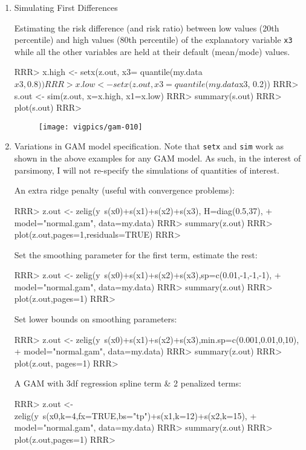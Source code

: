 \begin{enumerate}
\item Simulating First Differences

Estimating the risk difference (and risk ratio) between low values (20th percentile) and high values (80th percentile) of the explanatory variable {\tt x3} while all the other variables are held at their default (mean/mode) values. 

\begin{Schunk}
\begin{Sinput}
RRR> x.high <- setx(z.out,  x3= quantile(my.data$x3, 0.8))
RRR> x.low <- setx(z.out, x3 = quantile(my.data$x3, 0.2))
RRR> s.out <- sim(z.out, x=x.high, x1=x.low)
RRR> summary(s.out)
RRR> plot(s.out)
RRR> 
\end{Sinput}
\end{Schunk}
\begin{figure}[here]
\centering
\texttt{[image: vigpics/gam-010]}
\label{fig:plotgam}
\end{figure}

\item Variations in GAM model specification. Note that {\tt setx} and {\tt sim} work as shown in the above examples for any GAM model. As such, in the interest of parsimony, I will not re-specify the simulations of quantities of interest. 

An extra ridge penalty (useful with convergence problems):
\begin{Schunk}
\begin{Sinput}
RRR> z.out <- zelig(y~s(x0)+s(x1)+s(x2)+s(x3), H=diag(0.5,37), 
+    model="normal.gam", data=my.data) 
RRR> summary(z.out)
RRR> plot(z.out,pages=1,residuals=TRUE)
RRR> 
\end{Sinput}
\end{Schunk}
Set the smoothing parameter for the first term, estimate the rest:
\begin{Schunk}
\begin{Sinput}
RRR> z.out <- zelig(y~s(x0)+s(x1)+s(x2)+s(x3),sp=c(0.01,-1,-1,-1), 
+    model="normal.gam", data=my.data)
RRR> summary(z.out)
RRR> plot(z.out,pages=1)
RRR> 
\end{Sinput}
\end{Schunk}
Set lower bounds on smoothing parameters:
\begin{Schunk}
\begin{Sinput}
RRR> z.out <- zelig(y~s(x0)+s(x1)+s(x2)+s(x3),min.sp=c(0.001,0.01,0,10),  
+     model="normal.gam", data=my.data) 
RRR> summary(z.out)
RRR> plot(z.out, pages=1)
RRR> 
\end{Sinput}
\end{Schunk}
A GAM with 3df regression spline term \& 2 penalized terms:
\begin{Schunk}
\begin{Sinput}
RRR> z.out <-zelig(y~s(x0,k=4,fx=TRUE,bs="tp")+s(x1,k=12)+s(x2,k=15), 
+     model="normal.gam", data=my.data)
RRR> summary(z.out)
RRR> plot(z.out,pages=1)
RRR> 
\end{Sinput}
\end{Schunk}
\end{enumerate}



